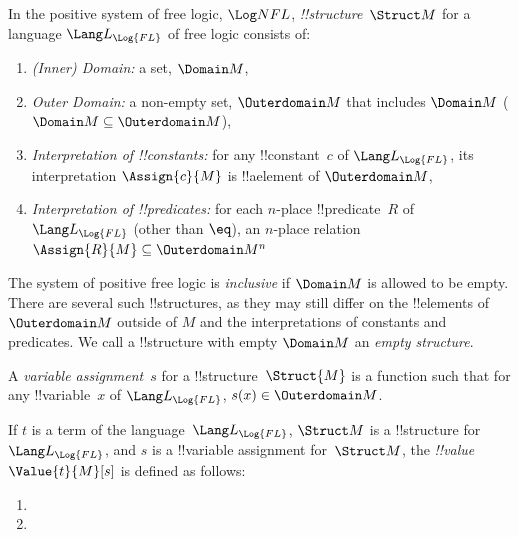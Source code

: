 \documentclass[../../../../include/open-logic-chapter]{subfiles}
\begin{document}
\begin{defn}[!!^{structure}s]
In the positive system of free logic, $\Log NFL$,
 \emph{!!{structure}}~$\Struct M$ for a language
$\Lang L_{\Log{FL}}$ of free logic consists of:
\begin{enumerate}
\item \emph{(Inner) Domain:} a set, $\Domain M$,
\item \emph{Outer Domain:} a non-empty set, $\Outerdomain M$ that
	includes $\Domain M$ ($\Domain M \subseteq \Outerdomain M $),
\item \emph{Interpretation of !!{constant}s:} for any !!{constant}~$c$ of
  $\Lang L_{\Log{FL}}$, its interpretation $\Assign{c}{M}$ is !!a{element} of 
  $\Outerdomain M$,
\item \emph{Interpretation of !!{predicate}s:} for each $n$-place
  !!{predicate}~$R$ of $\Lang L_{\Log{FL}}$ (other than $\eq$), an $n$-place
  relation $\Assign{R}{M} \subseteq \Outerdomain M^n$
\end{enumerate}
The system of positive free logic is \emph{inclusive} if $\Domain M$ is
allowed to be empty. There are several such !!{structure}s, as they may
still differ on the !!{element}s of $\Outerdomain M$ outside of $M$ and the 
interpretations of constants and predicates. We call a !!{structure} with
empty $\Domain M$ an \emph{empty structure}. 
\end{defn}

\begin{defn}
A \emph{variable assignment}~$s$ for a !!{structure}~$\Struct{M}$ is a
  function such that for any !!{variable}~$x$ of
  $\Lang L_{\Log{FL}}$, $s(x) \in \Outerdomain M$. 
\end{defn}

\begin{defn}
If $t$ is a term of the language~$\Lang L_{\Log{FL}}$, $\Struct M$ is a
!!{structure} for~$\Lang L_{\Log{FL}}$, and $s$ is a !!{variable} assignment
for~$\Struct M$, the \emph{!!{value}}~$\Value{t}{M}[s]$ is defined as
follows:
\begin{enumerate}
\item {}
\item {}
\end{enumerate}
\end{defn}
\end{document}
